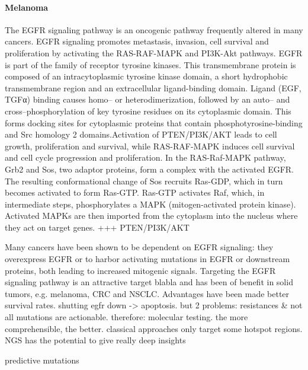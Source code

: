      \paragraph{Melanoma}


    The EGFR signaling pathway is an oncogenic pathway frequently altered in
    many cancers. EGFR signaling promotes metastasis, invasion, cell survival
    and proliferation by activating the RAS-RAF-MAPK and PI3K-Akt pathways. EGFR
    is part of the family of receptor tyrosine kinases. This transmembrane
    protein is composed of an intracytoplasmic tyrosine kinase domain, a short
    hydrophobic transmembrane region and an extracellular ligand-binding domain.
    Ligand (EGF, TGFα) binding causes homo-- or heterodimerization, followed by
    an auto-- and cross--phosphorylation of key tyrosine residues on its
    cytoplasmic domain. This forms docking sites for cytoplasmic proteins that
    contain phosphotyrosine-binding and Src homology 2 domains.Activation of
    PTEN/PI3K/AKT leads to cell growth, proliferation and survival, while
    RAS-RAF-MAPK induces cell survival and cell cycle progression and
    proliferation. In the RAS-Raf-MAPK pathway, Grb2 and Sos, two adaptor
    proteins, form a complex with the activated EGFR. The resulting
    conformational change of Sos recruits Ras-GDP, which in turn becomes
    activated to form Ras-GTP. Ras-GTP activates Raf, which, in intermediate
    steps, phosphorylates a MAPK (mitogen-activated protein kinase). Activated
    MAPKs are then imported from the cytoplasm into the nucleus where they act
    on target genes. +++ PTEN/PI3K/AKT

    Many cancers have been shown to be dependent on EGFR signaling: they
    overexpress EGFR or to harbor activating mutations in EGFR or downstream
    proteins, both leading to increased mitogenic signals. Targeting the EGFR
    signaling pathway is an attractive target blabla and has been of benefit in
    solid tumors, e.g. melanoma, CRC and NSCLC. Advantages have been made better
    survival rates. shutting egfr down -> apoptosis. but 2 problems: resistances &
    not all mutations are actionable. therefore: molecular testing. the more
    comprehensible, the better. classical approaches only target some hotspot
    regions. NGS has the potential to give really deep insights

    predictive mutations


